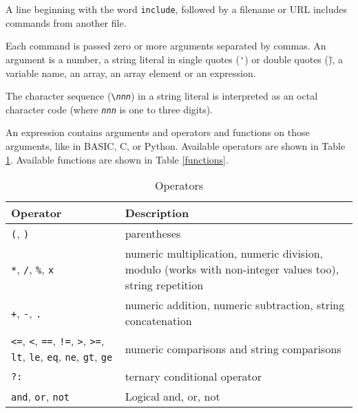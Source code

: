 A line beginning with the word \texttt{include}, followed by a filename
or URL includes commands from another file.

Each command is passed zero or more arguments separated by commas.
An argument is a number, a string literal in single quotes (\texttt{\'})
or double quotes (\texttt{\"}), a variable name, an array, an
array element or an expression.

The character sequence (\texttt{\textbackslash{}\textit{nnn}}) in
a string literal is interpreted as an octal character code (where
\texttt{\textit{nnn}} is one to three digits).

An expression contains arguments and operators and functions
on those arguments, like in BASIC, C, or Python.
Available operators are shown in Table \ref{operators}.
Available functions are shown in Table \ref{functions}.


\begin{table}[htb]
\begin{tabular}{|l|p{7cm}|}
\hline
Operator & Description \\
\hline
\hline

\texttt{(}, \texttt{)} & parentheses \\

\hline

\texttt{*}, \texttt{/}, \texttt{\%}, \texttt{x} &
numeric multiplication, numeric division, modulo (works
with non-integer values too), string repetition \\

\hline

\texttt{+}, \texttt{-}, \texttt{.} & numeric addition,
numeric subtraction, string concatenation \\

\hline

\texttt{<=}, \texttt{<}, \texttt{==},
\texttt{!=}, \texttt{>}, \texttt{>=},
\texttt{lt}, \texttt{le}, \texttt{eq},
\texttt{ne}, \texttt{gt}, \texttt{ge} &
numeric comparisons and string comparisons \\

\hline

\texttt{?:} & ternary conditional operator \\

\hline

\texttt{and},
\texttt{or},
\texttt{not} &
Logical and, or, not \\

\hline

\end{tabular}
\caption{Operators}
\label{operators}
\end{table}


